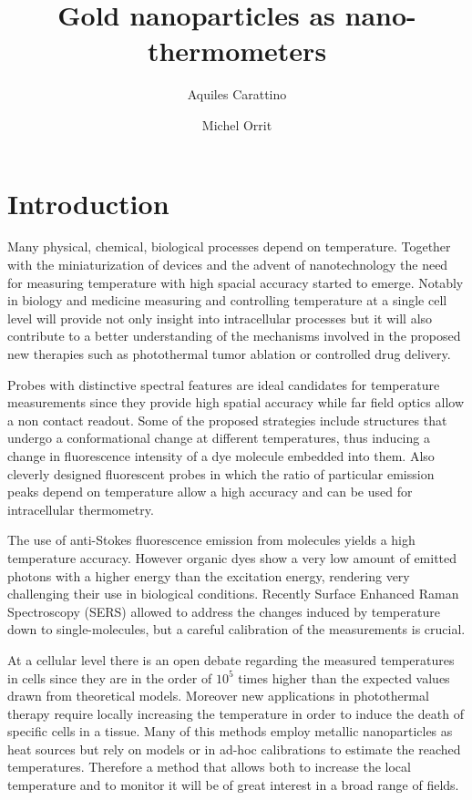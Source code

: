 \documentclass[journal=nalefd,manuscript=letter]{achemso}
\author{Aquiles Carattino}
\affiliation[Leiden]
{Huygens-Kamerlingh Onnes Lab, 2300RA Leiden, The Netherlands}
\author{Michel Orrit}
\affiliation[Leiden]
{Huygens-Kamerlingh Onnes Lab, 2300RA Leiden, The Netherlands}
\title{Gold nanoparticles as nano-thermometers}
\begin{document}
\maketitle
{}
\section{Introduction}
Many physical, chemical, biological processes depend on temperature. Together
with the miniaturization of devices and the advent of nanotechnology the need
for measuring temperature with high spacial accuracy started to emerge. Notably
in biology\cite{Yang2011a,Hrelescu2010} and medicine\cite{Li2013c}
measuring and controlling temperature at a single cell level will provide not only insight into
intracellular processes but it will also contribute to a better understanding of
the mechanisms involved in the proposed new therapies such as photothermal tumor
ablation\cite{Gobin2007} or controlled drug
delivery\cite{Huang2006}\cite{Huo2014}.

Probes with distinctive spectral features are ideal candidates for temperature
measurements since they provide high spatial accuracy while far field optics
allow a non contact readout. Some of the proposed strategies include structures
that undergo a conformational change at different
temperatures\cite{Ebrahimi2014}, thus inducing a change in fluorescence
intensity of a dye molecule embedded into them. Also cleverly designed
fluorescent probes\cite{Vetrone2010} in which the ratio of particular emission
peaks depend on temperature allow a high accuracy and can be used for
intracellular thermometry.

The use of anti-Stokes fluorescence emission from molecules yields a high
temperature accuracy\cite{Auzel2004a}. However organic dyes show a very low
amount of emitted photons with a higher energy than the excitation energy,
rendering very challenging their use in biological conditions. Recently Surface
Enhanced Raman Spectroscopy (SERS) allowed to address the changes induced by
temperature down to single-molecules\cite{Pozzi2015}, but a careful calibration
of the measurements is crucial.

At a cellular level there is an open debate regarding the measured temperatures
in cells since they are in the order of $10^5$ times higher than the expected
values drawn from theoretical models\cite{Yang2011a,Suzuki2015}. Moreover
new applications in photothermal therapy require locally increasing the
temperature in order to induce the death of specific cells in a
tissue\cite{Huang2008}\cite{Huang2006}. Many of this methods employ metallic
nanoparticles as heat sources\cite{Gobin2007}\cite{Hirsch2003} but rely on
models\cite{Zhao2014a} or in ad-hoc calibrations to estimate the reached
temperatures\cite{Donner2013}. Therefore a method that allows both to increase
the local temperature and to monitor it will be of great interest in a broad
range of fields.
\end{document}
